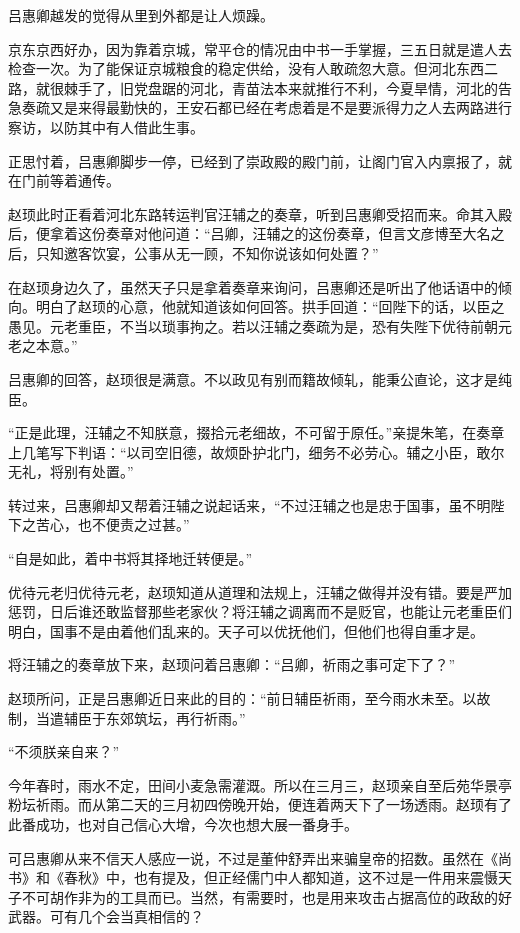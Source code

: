 吕惠卿越发的觉得从里到外都是让人烦躁。

京东京西好办，因为靠着京城，常平仓的情况由中书一手掌握，三五日就是遣人去检查一次。为了能保证京城粮食的稳定供给，没有人敢疏忽大意。但河北东西二路，就很棘手了，旧党盘踞的河北，青苗法本来就推行不利，今夏旱情，河北的告急奏疏又是来得最勤快的，王安石都已经在考虑着是不是要派得力之人去两路进行察访，以防其中有人借此生事。

正思忖着，吕惠卿脚步一停，已经到了崇政殿的殿门前，让阁门官入内禀报了，就在门前等着通传。

赵顼此时正看着河北东路转运判官汪辅之的奏章，听到吕惠卿受招而来。命其入殿后，便拿着这份奏章对他问道：“吕卿，汪辅之的这份奏章，但言文彦博至大名之后，只知邀客饮宴，公事从无一顾，不知你说该如何处置？”

在赵顼身边久了，虽然天子只是拿着奏章来询问，吕惠卿还是听出了他话语中的倾向。明白了赵顼的心意，他就知道该如何回答。拱手回道：“回陛下的话，以臣之愚见。元老重臣，不当以琐事拘之。若以汪辅之奏疏为是，恐有失陛下优待前朝元老之本意。”

吕惠卿的回答，赵顼很是满意。不以政见有别而籍故倾轧，能秉公直论，这才是纯臣。

“正是此理，汪辅之不知朕意，掇拾元老细故，不可留于原任。”亲提朱笔，在奏章上几笔写下判语：“以司空旧德，故烦卧护北门，细务不必劳心。辅之小臣，敢尔无礼，将别有处置。”

转过来，吕惠卿却又帮着汪辅之说起话来，“不过汪辅之也是忠于国事，虽不明陛下之苦心，也不便责之过甚。”

“自是如此，着中书将其择地迁转便是。”

优待元老归优待元老，赵顼知道从道理和法规上，汪辅之做得并没有错。要是严加惩罚，日后谁还敢监督那些老家伙？将汪辅之调离而不是贬官，也能让元老重臣们明白，国事不是由着他们乱来的。天子可以优抚他们，但他们也得自重才是。

将汪辅之的奏章放下来，赵顼问着吕惠卿：“吕卿，祈雨之事可定下了？”

赵顼所问，正是吕惠卿近日来此的目的：“前日辅臣祈雨，至今雨水未至。以故制，当遣辅臣于东郊筑坛，再行祈雨。”

“不须朕亲自来？”

今年春时，雨水不定，田间小麦急需灌溉。所以在三月三，赵顼亲自至后苑华景亭粉坛祈雨。而从第二天的三月初四傍晚开始，便连着两天下了一场透雨。赵顼有了此番成功，也对自己信心大增，今次也想大展一番身手。

可吕惠卿从来不信天人感应一说，不过是董仲舒弄出来骗皇帝的招数。虽然在《尚书》和《春秋》中，也有提及，但正经儒门中人都知道，这不过是一件用来震慑天子不可胡作非为的工具而已。当然，有需要时，也是用来攻击占据高位的政敌的好武器。可有几个会当真相信的？

